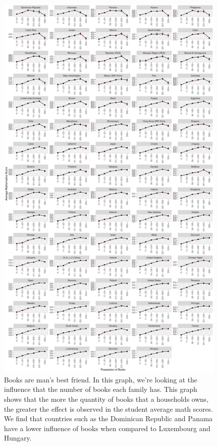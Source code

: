 \begin{Schunk}
\begin{figure}[H]
\includegraphics[width=1\linewidth]{learningtower_files/figure-latex/book-plot-1} \caption[Books are man's best friend]{Books are man's best friend. In this graph, we're looking at the influence that the number of books each family has. This graph shows that the more the quantity of books that a households owns, the greater the effect is observed in the student average math scores. We find that countries such as the Dominican Republic and Panama have a lower influence of books when compared to Luxembourg and Hungary.}\label{fig:book-plot}
\end{figure}
\end{Schunk}

